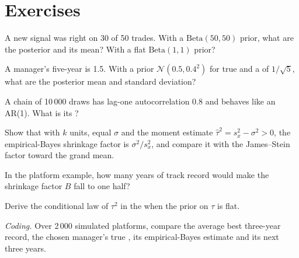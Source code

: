 \section{Exercises}

\begin{exercise}[$\star$]\label{exo:qm:bayesian-methods:1}
A new signal was right on 30 of 50 trades. With a $\mathrm{Beta}(50, 50)$ prior, what are the posterior and its mean? With a flat
$\mathrm{Beta}(1, 1)$ prior?
\end{exercise}

\begin{exercise}[$\star$]\label{exo:qm:bayesian-methods:2}
A manager's five-year  is 1.5. With a prior $\mathcal N(0.5, 0.4^2)$ for true  and a  of
$1/\sqrt5$, what are the posterior mean and standard deviation?
\end{exercise}

\begin{exercise}[$\star$]\label{exo:qm:bayesian-methods:3}
A chain of 10\,000 draws has lag-one autocorrelation 0.8 and behaves like an AR(1). What is its ?
\end{exercise}

\begin{exercise}[$\star\star$]\label{exo:qm:bayesian-methods:4}
Show that with $k$ units, equal $\sigma$ and the moment estimate $\hat\tau^2 = s_x^2 - \sigma^2 > 0$, the empirical-Bayes shrinkage factor is
$\sigma^2/s_x^2$, and compare it with the James--Stein factor toward the grand mean.
\end{exercise}

\begin{exercise}[$\star\star$]\label{exo:qm:bayesian-methods:5}
In the platform example, how many years of track record would make the shrinkage factor $B$ fall to one half?
\end{exercise}

\begin{exercise}[$\star\star$]\label{exo:qm:bayesian-methods:6}
Derive the conditional law of $\tau^2$ in the  when the prior on $\tau$ is flat.
\end{exercise}

\begin{exercise}[$\star\star\star$]\label{exo:qm:bayesian-methods:7}
\emph{Coding.} Over 2\,000 simulated platforms, compare the average best three-year record, the chosen manager's true , its
empirical-Bayes estimate and its next three years.
\end{exercise}

